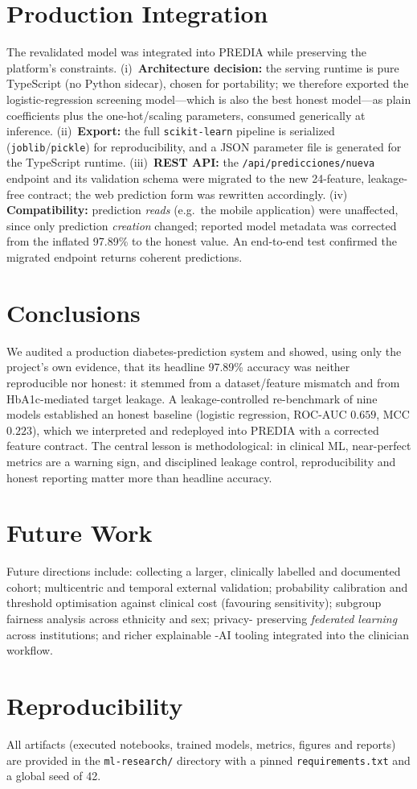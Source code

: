 \documentclass[conference]{IEEEtran}
\begin{document}
\section{Production Integration}
The revalidated model was integrated into PREDIA while preserving the platform's
constraints. (i)~\textbf{Architecture decision:} the serving runtime is
pure TypeScript (no Python sidecar), chosen for portability; we therefore
exported the logistic-regression screening model---which is also the best honest
model---as plain coefficients plus the one-hot/scaling parameters, consumed
generically at inference. (ii)~\textbf{Export:} the full
\texttt{scikit-learn} pipeline is serialized (\texttt{joblib}/\texttt{pickle})
for reproducibility, and a JSON parameter file is generated for the TypeScript
runtime. (iii)~\textbf{REST API:} the \texttt{/api/predicciones/nueva} endpoint
and its validation schema were migrated to the new 24-feature, leakage-free
contract; the web prediction form was rewritten accordingly. (iv)~\textbf{
Compatibility:} prediction \emph{reads} (e.g.\ the mobile application) were
unaffected, since only prediction \emph{creation} changed; reported model
metadata was corrected from the inflated 97.89\% to the honest value. An
end-to-end test confirmed the migrated endpoint returns coherent predictions.

\section{Conclusions}
We audited a production diabetes-prediction system and showed, using only the
project's own evidence, that its headline 97.89\% accuracy was neither
reproducible nor honest: it stemmed from a dataset/feature mismatch and from
HbA1c-mediated target leakage. A leakage-controlled re-benchmark of nine models
established an honest baseline (logistic regression, ROC-AUC $0.659$, MCC
$0.223$), which we interpreted and redeployed into PREDIA with a corrected
feature contract. The central lesson is methodological: in clinical ML,
near-perfect metrics are a warning sign, and disciplined leakage control,
reproducibility and honest reporting matter more than headline accuracy.

\section{Future Work}
Future directions include: collecting a larger, clinically labelled and
documented cohort; multicentric and temporal external validation; probability
calibration and threshold optimisation against clinical cost (favouring
sensitivity); subgroup fairness analysis across ethnicity and sex; privacy-
preserving \emph{federated learning} across institutions; and richer explainable
-AI tooling integrated into the clinician workflow.

\section*{Reproducibility}
All artifacts (executed notebooks, trained models, metrics, figures and reports)
are provided in the \texttt{ml-research/} directory with a pinned
\texttt{requirements.txt} and a global seed of 42.



\end{document}
